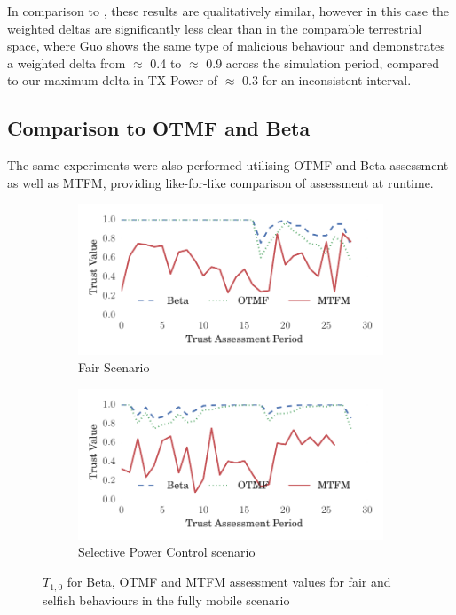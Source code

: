 \documentclass[conference]{IEEEtran}
\begin{document}
In comparison to \cite{Guo11}, these results are qualitatively similar, however in this case the weighted deltas are significantly less clear than in the comparable terrestrial space, where Guo shows the same type of malicious behaviour and demonstrates a weighted delta from $\approx$ 0.4 to $\approx$ 0.9 across the simulation period, compared to our maximum delta in TX Power of $\approx$ 0.3 for an inconsistent interval.


\subsection{Comparison to OTMF and Beta}

The same experiments were also performed utilising OTMF and Beta assessment as well as MTFM, providing like-for-like comparison of assessment at runtime.
%
\begin{figure}[h]
  \begin{subfigure}{0.5\textwidth}
    \centering
    \includegraphics[width=.95\linewidth]{img/trust_beta_otmf_fair.pdf}
    \caption{Fair Scenario}
    \label{fig:all_mobile_fair_beta}
  \end{subfigure}
  \begin{subfigure}{0.5\textwidth}
    \centering
    \includegraphics[width=.95\linewidth]{img/trust_beta_otmf_malicious.pdf}
    \caption{Selective Power Control scenario}
    \label{fig:all_mobile_badmouthing_beta}
  \end{subfigure}
\caption{$T_{1,0}$ for Beta, OTMF and MTFM assessment values for fair and selfish behaviours in the fully mobile scenario}
\label{fig:otmf_beta_comparison}
\end{figure}
\end{document}
